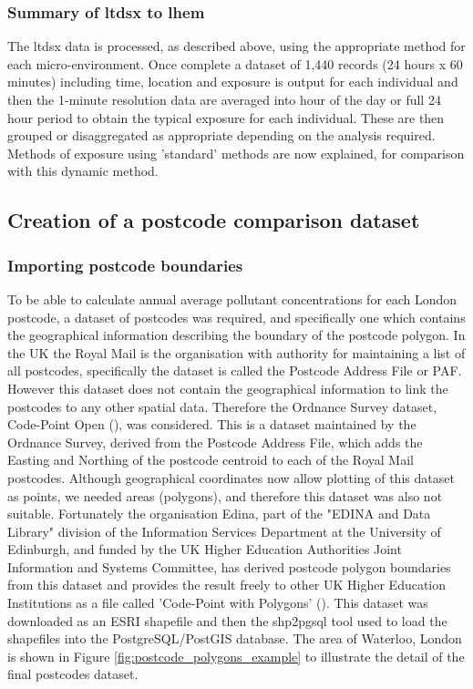         \subsubsection{Summary of ltdsx to lhem}
        \label{sec:summary_of_ltdsx_to_lhem}

The \gls{ltdsx} data is processed, as described above, using the appropriate method for each micro-environment. Once complete a dataset of 1,440 records (24 hours x 60 minutes) including time, location and exposure is output for each individual and then the 1-minute resolution data are averaged into hour of the day or full 24 hour period to obtain the typical exposure for each individual. These are then grouped or disaggregated as appropriate depending on the analysis required. Methods of exposure using 'standard' methods are now explained, for comparison with this dynamic method.

    \subsection{Creation of a postcode comparison dataset}
    \label{sec:creating_postcode_dataset}

        \subsubsection{Importing postcode boundaries}
        \label{sec:import_postcode_boundaries}

To be able to calculate annual average pollutant concentrations for each London postcode, a dataset of postcodes was required, and specifically one which contains the geographical information describing the boundary of the postcode polygon. In the UK the Royal Mail is the organisation with authority for maintaining a list of all postcodes, specifically the dataset is called the Postcode Address File or PAF. However this dataset does not contain the geographical information to link the postcodes to any other spatial data. Therefore the Ordnance Survey dataset, Code-Point Open (\cite{OrdnanceSurvey2015a}), was considered. This is a dataset maintained by the Ordnance Survey, derived from the Postcode Address File, which adds the Easting and Northing of the postcode centroid to each of the Royal Mail postcodes. Although geographical coordinates now allow plotting of this dataset as points, we needed areas (polygons), and therefore this dataset was also not suitable. Fortunately the organisation Edina, part of the "EDINA and Data Library" division of the Information Services Department at the University of Edinburgh, and funded by the UK Higher Education Authorities Joint Information and Systems Committee, has derived postcode polygon boundaries from this dataset and provides the result freely to other UK Higher Education Institutions as a file called 'Code-Point with Polygons' (\cite{OrdnanceSurvey2015}). This dataset was downloaded as an ESRI shapefile and then the shp2pgsql tool used to load the shapefiles into the PostgreSQL/PostGIS database. The area of Waterloo, London is shown in Figure \ref{fig:postcode_polygons_example} to illustrate the detail of the final postcodes dataset.

